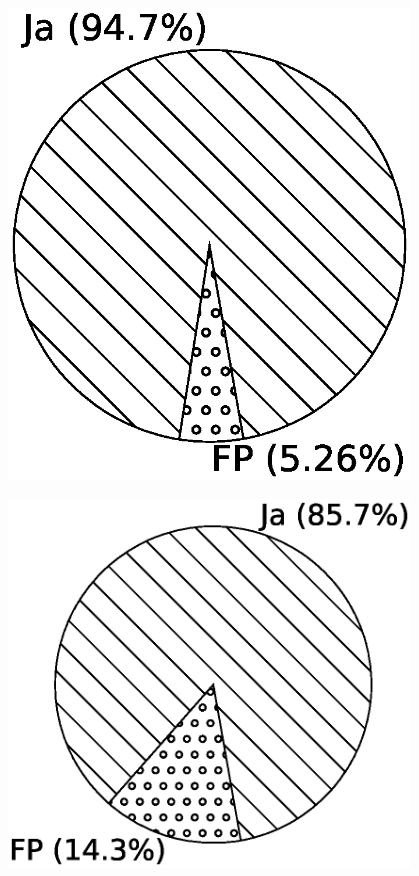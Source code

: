 \begin{minipage}{0.45\textwidth}
  \centering  
  \includegraphics[width=0.8\textwidth]{img/pi_standard_channel.eps}
  \label{Chap:Eval-Sec:Stand-Fig:Channel}
\end{minipage}
\hfill
\begin{minipage}{0.45\textwidth}
  \centering
  \includegraphics[width=0.8\textwidth]{img/pi_standard_mix.eps}
  \label{Chap:Eval-Sec:Stand-Fig:Mix}
\end{minipage}

